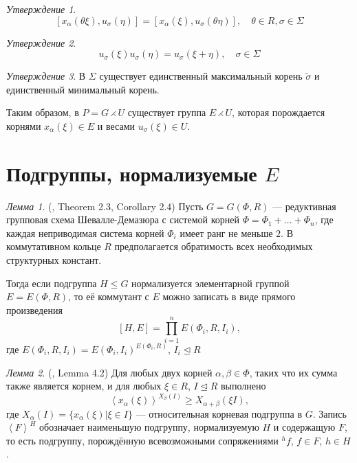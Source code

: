 \documentclass[10pt]{article}
\theoremstyle{remark}
\newtheorem{prop}{Утверждение}
\newtheorem{lm}{Лемма}
\renewcommand{\le}{\leqslant}
\renewcommand{\ge}{\geqslant}
\begin{document}
\begin{prop}
  $$[x_\alpha(\theta\xi),u_\sigma(\eta)] = [x_\alpha(\xi),u_\sigma(\theta\eta)], \quad \theta \in R, \sigma \in \Sigma$$
\end{prop}

\begin{prop}
  $$ u_\sigma(\xi) u_\sigma(\eta) = u_\sigma(\xi + \eta), \quad \sigma \in \Sigma $$
\end{prop}

\begin{prop}
  В $\Sigma$ существует единственный максимальный корень $\widetilde{\sigma}$ и единственный минимальный корень.
\end{prop}

Таким образом, в $P = G \rightthreetimes U $ существует группа $E \rightthreetimes U$, которая порождается корнями $x_\alpha(\xi) \in E$ и весами $u_\sigma(\xi) \in U$.

\section{Подгруппы, нормализуемые $E$}

\begin{lm}(\citep{Stavrova2009}, Theorem 2.3, Corollary 2.4)
  \label{directproduct}
  Пусть $G = G(\Phi, R)$ --- редуктивная групповая схема Шевалле-Демазюра
  с системой корней $\Phi = \Phi_1 + \ldots + \Phi_n$, где каждая неприводимая система корней $\Phi_i$ имеет ранг не меньше $2$. В коммутативном кольце $R$ предполагается обратимость всех необходимых структурных констант.
  
  Тогда если подгруппа $H \le G$ нормализуется элементарной группой $E = E(\Phi,R)$, то её коммутант с $E$ можно записать в виде прямого произведения
  $$ [H, E] = \prod_{i=1}^n E(\Phi_i,R,I_i), $$
  где $E(\Phi_i,R,I_i) = E(\Phi_i,I_i)^{E(\Phi_i,R)}$, $I_i \trianglelefteq R$
\end{lm}

\begin{lm}(\citep{Stavrova2009}, Lemma 4.2)
  \label{transitivity}
  Для любых двух корней $\alpha, \beta \in \Phi$, таких что их сумма также является корнем, и для любых  $\xi \in R$, $I \trianglelefteq R$ выполнено
  $$ \left< x_\alpha(\xi) \right>^{X_\beta(I)} \ge X_{\alpha + \beta}(\xi I), $$  
  где $X_\alpha(I) = \{x_\alpha(\xi) | \xi \in I\}$ --- относительная корневая подгруппа в $G$. Запись $\left<F\right>^H$ обозначает наименьшую подгруппу, нормализуемую $H$ и содержащую $F$, то есть подгруппу, порождённую всевозможными сопряжениями $^hf$, $f \in F$, $h \in H$.
\end{lm}
\end{document}
